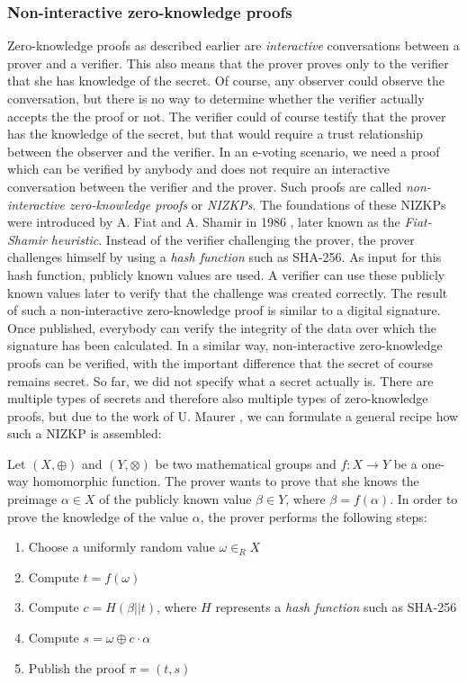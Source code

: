 \documentclass[numbers=noenddot, abstract=on, a4paper, headsepline,
footsepline, oneside, openright, draft=off, listof=leveldown]{scrreprt}
\begin{document}
\subsubsection{Non-interactive zero-knowledge proofs}
\label{sec:nizkp}
Zero-knowledge proofs as described earlier are \textit{interactive}
conversations between a prover and a verifier. This also means that the prover
proves only to the verifier that she has knowledge of the secret. Of course, any
observer could observe the conversation, but there is no way to determine
whether the verifier actually accepts the the proof or not. The verifier could
of course testify that the prover has the knowledge of the secret, but that
would require a trust relationship between the observer and the verifier. In
an e-voting scenario, we need a proof which can be verified by anybody and does
not require an interactive conversation between the verifier and the prover.
Such proofs are called \textit{non-interactive zero-knowledge proofs} or
\textit{NIZKPs}. The foundations of these NIZKPs were introduced by A. Fiat and
A. Shamir in 1986 \cite{FS87}, later known as the \textit{Fiat-Shamir
heuristic}. Instead of the verifier challenging the prover, the prover
challenges himself by using a \emph{hash function} such as SHA-256. As input for
this hash function, publicly known values are used. A verifier can use these
publicly known values later to verify that the challenge was created correctly.
The result of such a non-interactive zero-knowledge proof is similar to a
digital signature. Once published, everybody can verify the integrity of the
data over which the signature has been calculated. In a similar way,
non-interactive zero-knowledge proofs can be verified, with the important
difference that the secret of course remains secret. So far, we did not specify
what a secret actually is. There are multiple types of secrets and therefore
also multiple types of zero-knowledge proofs, but due to the work of U. Maurer
\cite{Maurer09}, we can formulate a general recipe how such a NIZKP is
assembled:

Let $(X,\oplus)$ and $(Y,\otimes)$ be two mathematical groups and
$f:X \rightarrow Y$ be a one-way homomorphic function. The prover wants to prove
that she knows the preimage $\alpha \in X$ of the publicly known value $\beta \in
Y$, where $\beta=f(\alpha)$. In order to prove the knowledge of the value
$\alpha$, the prover performs the following steps:
\begin{enumerate}
  \item Choose a uniformly random value $\omega \in_R X$
  \item Compute $t=f(\omega)$
  \item Compute $c=H(\beta||t)$, where $H$ represents a \emph{hash function} such
  as SHA-256
  \item Compute $s=\omega \oplus c \cdot \alpha$
  \item Publish the proof $\pi = (t,s)$
\end{enumerate}
\end{document}
